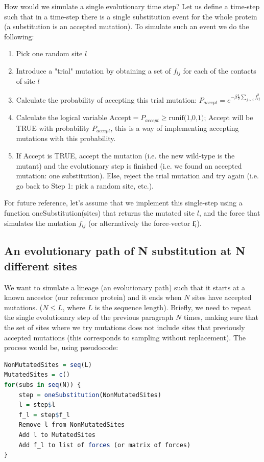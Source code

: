 \documentclass[12pt]{article}
\begin{document}
How would we simulate a single evolutionary time step? Let us define a time-step such that in a time-step there is a single substitution event for the whole protein (a substitution is an accepted mutation). To simulate such an event we do the following:
\begin{enumerate}
\item Pick one random site $l$
\item Introduce a "trial" mutation by obtaining a set of ${f_{lj}}$ for each of the contacts of site $l$
\item Calculate the probability of accepting this trial mutation: $P_{accept} = e^{-\beta \frac{1}{2} \sum_{j\sim i}  f_{lj}^2}$
\item Calculate the logical variable $\text{Accept} = P_{accept} \ge \text{runif(1,0,1)}$; Accept will be TRUE with probability $P_{accept}$, this is a way of implementing accepting mutations with this probability.
\item If Accept is TRUE, accept the mutation (i.e. the new wild-type is the mutant) and the evolutionary step is finished (i.e. we found an accepted mutation: one substitution). Else, reject the trial mutation and try again (i.e. go back to Step 1: pick a random site, etc.).
\end{enumerate}
For future reference, let's assume that we implement this single-step using a function oneSubstitution(sites) that returns the mutated site $l$, and the force that simulates the mutation ${f_{lj}}$ (or alternatively the force-vector $\mathbf{f}_l$). 

\subsection{An evolutionary path of N substitution at N different sites}
We want to simulate a lineage (an evolutionary path) such that it starts at a known ancestor (our reference protein) and it ends when $N$ sites have accepted mutations. ($N \le L$, where $L$ is the sequence length). Briefly, we need to repeat the single evolutionary step of the previous paragraph $N$ times, making sure that the set of sites where we try mutations does not include sites that previously accepted mutations (this corresponds to sampling without replacement). The process would be, using pseudocode:


\begin{lstlisting}[language=R]
NonMutatedSites = seq(L)
MutatedSites = c()
for(subs in seq(N)) {
	step = oneSubstitution(NonMutatedSites)
    l = step$l
    f_l = step$f_l
    Remove l from NonMutatedSites
    Add l to MutatedSites
    Add f_l to list of forces (or matrix of forces)
}
\end{lstlisting}
\end{document}
